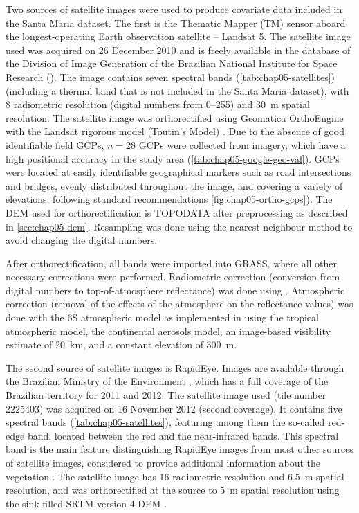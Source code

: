 Two sources of satellite images were used to produce covariate data included in the Santa Maria dataset. The 
first is the Thematic Mapper (TM) sensor aboard the longest-operating Earth observation satellite -- Landsat 5. 
The satellite image used was acquired on \num{26} December \num{2010} and is freely available in the database 
of the Division of Image Generation of the Brazilian National Institute for Space Research (\inpedgi). The 
image contains seven spectral bands (\autoref{tab:chap05-satellites}) (including a thermal band that is not 
included in the Santa Maria dataset), with \SI{8}{\bit} radiometric resolution (digital numbers from 
\numrange{0}{255}) and \SI{30}{\m} spatial resolution. The satellite image was orthorectified using 
Geomatica\textregistered{} OrthoEngine\textregistered{} with the Landsat rigorous model (Toutin's Model) 
\cite{Toutin2004, PCIGeomatics2007}. Due to the absence of good identifiable field GCPs, $n = 28$ GCPs were 
collected from \googleearth{} imagery, which have a high positional accuracy in the study area 
(\autoref{tab:chap05-google-geo-val}). GCPs were located 
at easily identifiable geographical markers such as road intersections and bridges, evenly distributed 
throughout the image, and covering a variety of elevations, following standard recommendations 
\cite{PCIGeomatics2007} \autoref{fig:chap05-ortho-gcps}). The DEM used for orthorectification is TOPODATA after 
preprocessing as described in \autoref{sec:chap05-dem}. Resampling was done using the nearest neighbour method 
to avoid changing the digital numbers.

After orthorectification, all bands were imported into GRASS, where all other necessary corrections were 
performed. Radiometric correction (conversion from digital numbers to top-of-atmosphere reflectance) was done 
using . Atmospheric correction (removal of the effects of the atmosphere on the 
reflectance values) was done with the 6S atmospheric model \cite{VermoteEtAl1997} as implemented in 
 using the tropical atmospheric model, the continental aerosols model, an image-based 
visibility estimate of \SI{20}{\km}, and a constant elevation of \SI{300}{\m}.

The second source of satellite images is RapidEye. Images are available through the Brazilian Ministry of the 
Environment \cite{Brasil2012}, which has a full coverage of the Brazilian territory for \num{2011} and 
\num{2012}. The satellite image used (tile number \num{2225403}) was acquired on \num{16} November \num{2012} 
(second coverage). It contains five spectral bands 
(\autoref{tab:chap05-satellites}), featuring among them the so-called red-edge band, located between the red 
and the near-infrared bands. This spectral band is the main feature distinguishing RapidEye images from most 
other sources of satellite images, considered to provide additional information about the vegetation 
\cite{WeicheltEtAl2013}. The satellite image has \SI{16}{\bit} radiometric resolution and \SI{6.5}{\m} spatial 
resolution, and was orthorectified at the source to \SI{5}{\m} spatial resolution using the sink-filled SRTM 
version \num{4} DEM \cite{RapidEye2013}.

